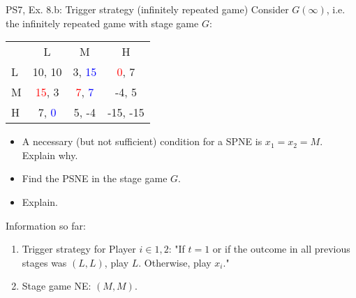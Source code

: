 \begin{frame}{PS7, Ex. 8.b: Trigger strategy (infinitely repeated game)}
    Consider $G(\infty)$, i.e. the infinitely repeated game with stage game $G$: \vspace{-6pt}
    \begin{table}
      \begin{tabular}{l|c|c|c|}
        \multicolumn{1}{c}{} & \multicolumn{1}{c}{L} & \multicolumn{1}{c}{M} & \multicolumn{1}{c}{H} \\\cline{2-4}
        L & 10, 10 & 3, \textcolor{blue}{15} & \textcolor{red}{0}, 7 \\\cline{2-4}
        M & \textcolor{red}{15}, 3 & \textcolor{red}{7}, \textcolor{blue}{7} & -4, 5 \\\cline{2-4}
        H & 7, \textcolor{blue}{0} & 5, -4 & -15, -15 \\\cline{2-4}
      \end{tabular}
    \end{table}
    \begin{itemize}
      \item[(b)] A necessary (but not sufficient) condition for a SPNE is $x_1 = x_2 = M$. Explain why.
    \end{itemize}
    \begin{multicols}{2}
      \begin{itemize}
        \item[(Step a)] Find the PSNE in the stage game $G$.
        \item[(Step b)] Explain.
      \end{itemize}
      \vfill\null\columnbreak
      Information so far:
      \begin{enumerate}
        \item Trigger strategy for Player $i\in1,2$: "If $t=1$ or if the outcome in all previous stages was $(L,L)$, play $L$. Otherwise, play $x_i$."
        \item Stage game NE: $(M,M)$.
      \end{enumerate}
      \vfill\null
    \end{multicols}
\end{frame}
